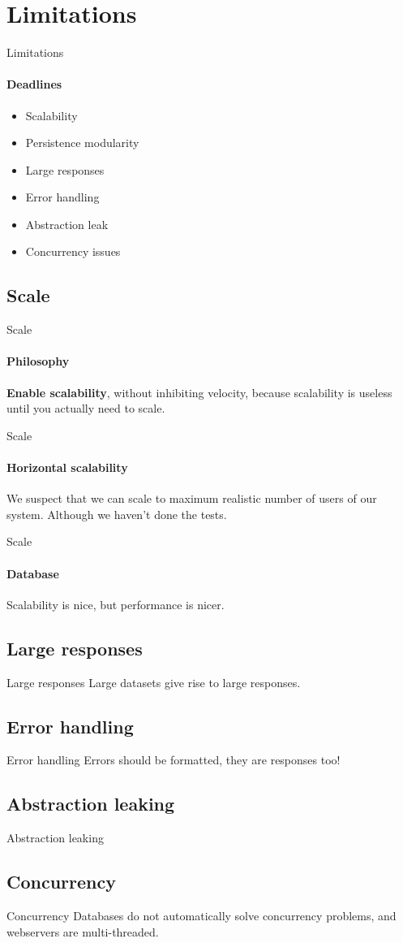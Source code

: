 \section{Limitations}

\begin{frame}{Limitations}
	\framesubtitle{Deadlines}
	\begin{itemize}
		\item{Scalability}
		\item{Persistence modularity}
		\item{Large responses}
		\item{Error handling}
		\item{Abstraction leak}
		\item{Concurrency issues}
	\end{itemize}
\end{frame}

\subsection{Scale}

\begin{frame}{Scale}
	\framesubtitle{Philosophy}
	\textbf{Enable scalability}, without inhibiting velocity,
	because scalability is useless until you actually need to scale.
\end{frame}

\begin{frame}{Scale}
	\framesubtitle{Horizontal scalability}
	We suspect that we can scale to maximum realistic number of users of our system. Although we haven't done the tests.
\end{frame}

\begin{frame}{Scale}
	\framesubtitle{Database}
	Scalability is nice, but performance is nicer.
\end{frame}

\subsection{Large responses}
\begin{frame}{Large responses}
	Large datasets give rise to large responses.
\end{frame}

\subsection{Error handling}
\begin{frame}{Error handling}
	Errors should be formatted, they are responses too!
\end{frame}

\subsection{Abstraction leaking}
\begin{frame}{Abstraction leaking}
\end{frame}

\subsection{Concurrency}
\begin{frame}{Concurrency}
	Databases do not automatically solve concurrency problems, and webservers are multi-threaded.
\end{frame}
